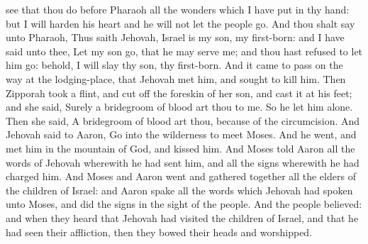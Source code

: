 see that thou do before Pharaoh all the wonders which I have put in thy hand: but I will harden his heart and he will not let the people go. And thou shalt say unto Pharaoh, Thus saith Jehovah, Israel is my son, my first-born: and I have said unto thee, Let my son go, that he may serve me; and thou hast refused to let him go: behold, I will slay thy son, thy first-born. And it came to pass on the way at the lodging-place, that Jehovah met him, and sought to kill him. Then Zipporah took a flint, and cut off the foreskin of her son, and cast it at his feet; and she said, Surely a bridegroom of blood art thou to me. So he let him alone. Then she said, A bridegroom of blood art thou, because of the circumcision.  And Jehovah said to Aaron, Go into the wilderness to meet Moses. And he went, and met him in the mountain of God, and kissed him. And Moses told Aaron all the words of Jehovah wherewith he had sent him, and all the signs wherewith he had charged him. And Moses and Aaron went and gathered together all the elders of the children of Israel: and Aaron spake all the words which Jehovah had spoken unto Moses, and did the signs in the sight of the people. And the people believed: and when they heard that Jehovah had visited the children of Israel, and that he had seen their affliction, then they bowed their heads and worshipped. 

